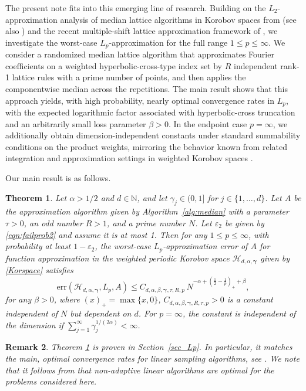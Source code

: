 \documentclass[a4paper,11pt]{article}
\newtheorem{theorem}{Theorem}[section]
\newtheorem{remark}[theorem]{Remark}
\newcommand{\bsgamma}{\boldsymbol{\gamma}}
\newcommand{\NN}{\mathbb{N}}
\newcommand{\Hcal}{\mathcal{H}}
\begin{document}
The present note fits into this emerging line of research. Building on the $L_2$-approximation analysis of median lattice algorithms in Korobov spaces from \cite{PKG25} (see also \cite{PGK25}) and the recent multiple-shift lattice approximation framework of \cite{CDG25}, we investigate the worst-case $L_p$-approximation for the full range $1 \le p \le \infty$. We consider a randomized median lattice algorithm that approximates Fourier coefficients on a weighted hyperbolic-cross-type index set by $R$ independent rank-1 lattice rules with a prime number of points, and then applies the componentwise median across the repetitions. The main result shows that this approach yields, with high probability, nearly optimal convergence rates in $L_p$, with the expected logarithmic factor associated with hyperbolic-cross truncation and an arbitrarily small loss parameter $\beta>0$. In the endpoint case $p=\infty$, we additionally obtain dimension-independent constants under standard summability conditions on the product weights, mirroring the behavior known from related integration and approximation settings in weighted Korobov spaces \cite{DKP22,KKNU19,KMNN21}.



Our main result is as follows.
\begin{theorem}\label{thm:main}
Let $\alpha>1/2$ and $d \in \NN$, and let $\gamma_j \in (0,1]$ for $j \in \{1, \ldots, d\}$.
Let $A$ be the approximation algorithm given by Algorithm~\ref{alg:median} with a parameter $\tau>0$, an odd number $R>1 $, and a prime number $N$. Let $\varepsilon_2$ be given by \eqref{eqn:failprob2} and assume it is at most 1.
Then for any $1 \le p \le \infty$, with probability at least $1 - \varepsilon_2$, the worst-case $L_p$-approximation error of $A$ for function approximation in the weighted periodic Korobov space $\Hcal_{d, \alpha, \bsgamma}$ given by \eqref{Korspace} satisfies
$$    \mathrm{err}(\Hcal_{d,\alpha,\bsgamma}, L_p, A) \leq     C_{d, \alpha, \beta, \bsgamma, \tau, R,p}\,  N^{ - \alpha + (\frac12 - \frac1p)_+ + \beta },$$ for any $\beta > 0$, where $(x)_+ = \max\{x, 0\}$, $C_{d, \alpha, \beta, \bsgamma, R,\tau,p} > 0$ is a constant independent of $N$ but dependent on $d$. For $p= \infty$, the constant is independent of the dimension if $\sum_{j=1}^\infty \gamma_j^{1/(2\alpha)} < \infty$.
\end{theorem}

\begin{remark}
Theorem \ref{thm:main} is proven in Section~\ref{sec_Lp}. In particular, it  matches the main, optimal convergence rates for linear sampling algorithms, see \cite[Section~5.1 and Corollary~19]{KPUU25}. We note that it follows from \cite[Theorem~4.7]{NW08} that non-adaptive linear algorithms are optimal for the problems considered here.
\end{remark}
\end{document}
